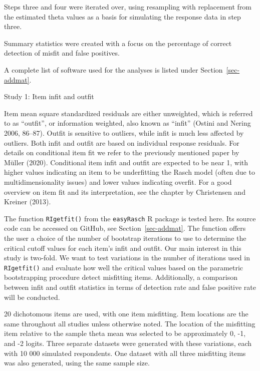 \documentclass[
  letterpaper,
  DIV=11,
  numbers=noendperiod]{scrartcl}
\begin{document}
Steps three and four were iterated over, using resampling with
replacement from the estimated theta values as a basis for simulating
the response data in step three.

Summary statistics were created with a focus on the percentage of
correct detection of misfit and false positives.

A complete list of software used for the analyses is listed under
Section~\ref{sec-addmat}.

Study 1: Item infit and outfit

Item mean square standardized residuals are either unweighted, which is
referred to as ``outfit'', or information weighted, also known as
``infit'' (Ostini and Nering 2006, 86--87). Outfit is sensitive to
outliers, while infit is much less affected by outliers. Both infit and
outfit are based on individual response residuals. For details on
conditional item fit we refer to the previously mentioned paper by
Müller (2020). Conditional item infit and outfit are expected to be near
1, with higher values indicating an item to be underfitting the Rasch
model (often due to multidimensionality issues) and lower values
indicating overfit. For a good overview on item fit and its
interpretation, see the chapter by Christensen and Kreiner (2013).

The function \texttt{RIgetfit()} from the \texttt{easyRasch} R package
is tested here. Its source code can be accessed on GitHub, see
Section~\ref{sec-addmat}. The function offers the user a choice of the
number of bootstrap iterations to use to determine the critical cutoff
values for each item's infit and outfit. Our main interest in this study
is two-fold. We want to test variations in the number of iterations used
in \texttt{RIgetfit()} and evaluate how well the critical values based
on the parametric bootstrapping procedure detect misfitting items.
Additionally, a comparison between infit and outfit statistics in terms
of detection rate and false positive rate will be conducted.

20 dichotomous items are used, with one item misfitting. Item locations
are the same throughout all studies unless otherwise noted. The location
of the misfitting item relative to the sample theta mean was selected to
be approximately 0, -1, and -2 logits. Three separate datasets were
generated with these variations, each with 10 000 simulated respondents.
One dataset with all three misfitting items was also generated, using
the same sample size.
\end{document}
